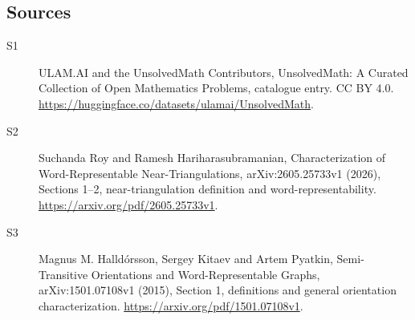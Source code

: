 \documentclass[11pt]{article}
\begin{document}
\subsection{Sources}
\begin{description}
\item[\hypertarget{source:statement:1}{S1}] ULAM.AI and the UnsolvedMath Contributors, UnsolvedMath: A Curated Collection of Open Mathematics Problems, catalogue entry. CC BY 4.0. \url{https://huggingface.co/datasets/ulamai/UnsolvedMath}.
\item[\hypertarget{source:statement:2}{S2}] Suchanda Roy and Ramesh Hariharasubramanian, Characterization of Word-Representable Near-Triangulations, arXiv:2605.25733v1 (2026), Sections 1--2, near-triangulation definition and word-representability. \url{https://arxiv.org/pdf/2605.25733v1}.
\item[\hypertarget{source:statement:3}{S3}] Magnus M. Halldórsson, Sergey Kitaev and Artem Pyatkin, Semi-Transitive Orientations and Word-Representable Graphs, arXiv:1501.07108v1 (2015), Section 1, definitions and general orientation characterization. \url{https://arxiv.org/pdf/1501.07108v1}.
\end{description}
\label{end:statement}
\end{document}
